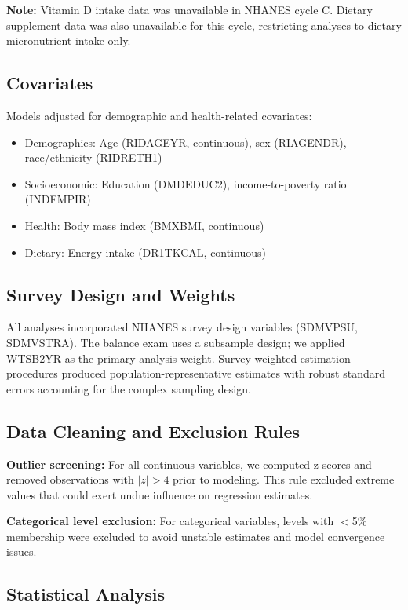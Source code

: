 \documentclass[11pt,a4paper]{article}
\begin{document}
\textbf{Note:} Vitamin D intake data was unavailable in NHANES cycle C. Dietary supplement data was also unavailable for this cycle, restricting analyses to dietary micronutrient intake only.

\subsection{Covariates}

Models adjusted for demographic and health-related covariates:
\begin{itemize}
    \item Demographics: Age (RIDAGEYR, continuous), sex (RIAGENDR), race/ethnicity (RIDRETH1)
    \item Socioeconomic: Education (DMDEDUC2), income-to-poverty ratio (INDFMPIR)
    \item Health: Body mass index (BMXBMI, continuous)
    \item Dietary: Energy intake (DR1TKCAL, continuous)
\end{itemize}

\subsection{Survey Design and Weights}

All analyses incorporated NHANES survey design variables (SDMVPSU, SDMVSTRA). The balance exam uses a subsample design; we applied WTSB2YR as the primary analysis weight. Survey-weighted estimation procedures produced population-representative estimates with robust standard errors accounting for the complex sampling design.

\subsection{Data Cleaning and Exclusion Rules}

\textbf{Outlier screening:} For all continuous variables, we computed z-scores and removed observations with $|z| > 4$ prior to modeling. This rule excluded extreme values that could exert undue influence on regression estimates.

\textbf{Categorical level exclusion:} For categorical variables, levels with $<$5\% membership were excluded to avoid unstable estimates and model convergence issues.

\subsection{Statistical Analysis}
\end{document}
